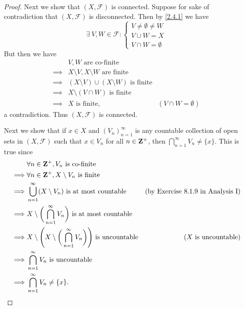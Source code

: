 \begin{proof}
  Next we show that \((X, \mathcal{F})\) is connected.
  Suppose for sake of contradiction that \((X, \mathcal{F})\) is disconnected.
  Then by \cref{2.4.1} we have
  \[
    \exists\ V, W \in \mathcal{F} : \begin{cases}
      V \neq \emptyset \neq W \\
      V \cup W = X            \\
      V \cap W = \emptyset
    \end{cases}
  \]
  But then we have
  \begin{align*}
             & V, W \text{ are co-finite}                                                      \\
    \implies & X \setminus V, X \setminus W \text{ are finite}                                 \\
    \implies & (X \setminus V) \cup (X \setminus W) \text{ is finite}                          \\
    \implies & X \setminus (V \cap W) \text{ is finite}                                        \\
    \implies & X \text{ is finite},                                   & (V \cap W = \emptyset)
  \end{align*}
  a contradiction.
  Thus \((X, \mathcal{F})\) is connected.

  Next we show that if \(x \in X\) and \((V_n)_{n = 1}^\infty\) is any countable collection of open sets in \((X, \mathcal{F})\) such that \(x \in V_n\) for all \(n \in \mathbf{Z}^+\), then \(\bigcap_{n = 1}^\infty V_n \neq \{x\}\).
  This is true since
  \begin{align*}
             & \forall n \in \mathbf{Z}^+, V_n \text{ is co-finite}                                                                                                 \\
    \implies & \forall n \in \mathbf{Z}^+, X \setminus V_n \text{ is finite}                                                                                        \\
    \implies & \bigcup_{n = 1}^\infty (X \setminus V_n) \text{ is at most countable}                             & \text{(by Exercise 8.1.9 in Analysis I)} \\
    \implies & X \setminus \bigg(\bigcap_{n = 1}^\infty V_n\bigg) \text{ is at most countable}                                                              \\
    \implies & X \setminus \Bigg(X \setminus \bigg(\bigcap_{n = 1}^\infty V_n\bigg)\Bigg) \text{ is uncountable} & \text{(\(X\) is uncountable)}            \\
    \implies & \bigcap_{n = 1}^\infty V_n \text{ is uncountable}                                                                                            \\
    \implies & \bigcap_{n = 1}^\infty V_n \neq \{x\}.
  \end{align*}


\end{proof}

